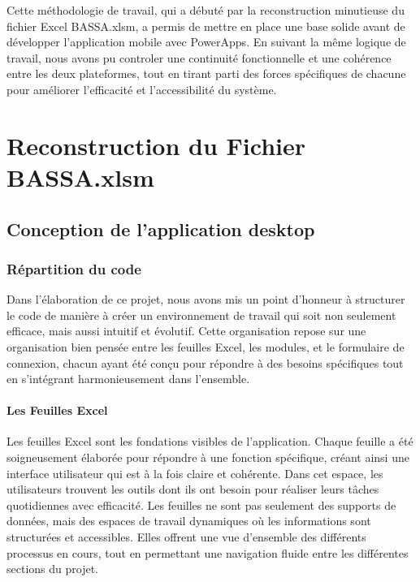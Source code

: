 \documentclass[a4paper, oneside, 12pt, final]{extreport}
\begin{document}
Cette méthodologie de travail, qui a débuté par la reconstruction minutieuse du fichier Excel BASSA.xlsm, a permis de mettre en place une base solide avant de développer l'application mobile avec PowerApps. En suivant la même logique de travail, nous avons pu controler une continuité fonctionnelle et une cohérence entre les deux plateformes, tout en tirant parti des forces spécifiques de chacune pour améliorer l'efficacité et l'accessibilité du système.


\newpage
\part{Reconstruction du Fichier BASSA.xlsm }
\chapter{Conception de l'application desktop}
\section{Répartition du code}
Dans l'élaboration de ce projet, nous avons mis un point d'honneur à structurer le code de manière à créer un environnement de travail qui soit non seulement efficace, mais aussi intuitif et évolutif. Cette organisation repose sur une organisation bien pensée entre les feuilles Excel, les modules, et le formulaire de connexion, chacun ayant été conçu pour répondre à des besoins spécifiques tout en s'intégrant harmonieusement dans l'ensemble.

\subsection{Les Feuilles Excel}
Les feuilles Excel sont les fondations visibles de l'application. Chaque feuille a été soigneusement élaborée pour répondre à une fonction spécifique, créant ainsi une interface utilisateur qui est à la fois claire et cohérente. Dans cet espace, les utilisateurs trouvent les outils dont ils ont besoin pour réaliser leurs tâches quotidiennes avec efficacité. Les feuilles ne sont pas seulement des supports de données, mais des espaces de travail dynamiques où les informations sont structurées et accessibles. Elles offrent une vue d'ensemble des différents processus en cours, tout en permettant une navigation fluide entre les différentes sections du projet.
\end{document}

